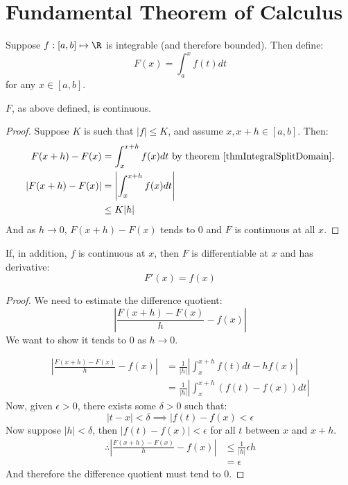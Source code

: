 \documentclass[../Main.tex]{subfiles}
\begin{document}
\section{Fundamental Theorem of Calculus}
Suppose $f : [a, b] \mapsto \R$ is integrable (and therefore bounded). Then define:
\begin{equation*}
    F(x) = \int_a^x f(t) dt
\end{equation*}
for any $x \in [a, b]$.
\begin{theorem}
    $F$, as above defined, is continuous.
    \label{thmIntegralCTS}
\end{theorem}
\begin{proof}
    Suppose $K$ is such that $|f| \leq K$, and assume $x, x+h \in [a, b]$. Then:
    \begin{align*}
        F(x + h) - F(x) &= \int_x^{x + h} f(x) dt \text{ by theorem~\ref{thmIntegralSplitDomain}.} \\
        \left|F(x + h) - F(x)\right| &= \left|\int_x^{x + h} f(x) dt\right| \\
        &\leq K|h|
    \end{align*}
    And as $h \to 0$, $F(x + h) - F(x)$ tends to $0$ and $F$ is continuous at all $x$.
\end{proof}
\begin{theorem}
    If, in addition, $f$ is continuous at $x$, then $F$ is differentiable at $x$ and has derivative:
    \begin{equation*}
        F'(x) = f(x)
    \end{equation*}
    \label{thmFundamentalCalculusI}
\end{theorem}
\begin{proof}
    We need to estimate the difference quotient:
    \begin{equation*}
        \left|\frac{F(x + h) - F(x)}{h} - f(x)\right|
    \end{equation*}
    We want to show it tends to $0$ as $h \to 0$.

    \begin{align*}
        \left|\frac{F(x + h) - F(x)}{h} - f(x)\right| &= \frac{1}{|h|} \left|\int_x^{x + h} f(t) dt - hf(x)\right| \\
        &= \frac{1}{|h|} \left|\int_x^{x + h} (f(t) - f(x))dt\right|
    \end{align*}
    Now, given $\epsilon > 0$, there exists some $\delta > 0$ such that:
    \begin{equation*}
        |t - x| < \delta \implies |f(t) - f(x) < \epsilon
    \end{equation*}
    Now suppose $|h| < \delta$, then $|f(t) - f(x)| < \epsilon$ for all $t$ between $x$ and $x + h$.
    \begin{align*}
        \therefore \left|\frac{F(x + h) - F(x)}{h} - f(x)\right| &\leq \frac{1}{|h|} \epsilon h \\
        &= \epsilon
    \end{align*}
    And therefore the difference quotient must tend to 0.
\end{proof}
\end{document}
